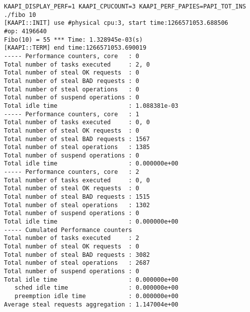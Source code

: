 \documentclass{article}
\begin{document}
\begin{itemize}
\begin{verbatim}
KAAPI_DISPLAY_PERF=1 KAAPI_CPUCOUNT=3 KAAPI_PERF_PAPIES=PAPI_TOT_INS ./fibo 10
[KAAPI::INIT] use #physical cpu:3, start time:1266571053.688506
#op: 4196640
Fibo(10) = 55 *** Time: 1.328945e-03(s)
[KAAPI::TERM] end time:1266571053.690019
----- Performance counters, core   : 0
Total number of tasks executed     : 2, 0
Total number of steal OK requests  : 0
Total number of steal BAD requests : 0
Total number of steal operations   : 0
Total number of suspend operations : 0
Total idle time                    : 1.088381e-03
----- Performance counters, core   : 1
Total number of tasks executed     : 0, 0
Total number of steal OK requests  : 0
Total number of steal BAD requests : 1567
Total number of steal operations   : 1385
Total number of suspend operations : 0
Total idle time                    : 0.000000e+00
----- Performance counters, core   : 2
Total number of tasks executed     : 0, 0
Total number of steal OK requests  : 0
Total number of steal BAD requests : 1515
Total number of steal operations   : 1302
Total number of suspend operations : 0
Total idle time                    : 0.000000e+00
----- Cumulated Performance counters
Total number of tasks executed     : 2
Total number of steal OK requests  : 0
Total number of steal BAD requests : 3082
Total number of steal operations   : 2687
Total number of suspend operations : 0
Total idle time                    : 0.000000e+00
   sched idle time                 : 0.000000e+00
   preemption idle time            : 0.000000e+00
Average steal requests aggregation : 1.147004e+00
\end{verbatim}

\end{itemize}
\end{document}
